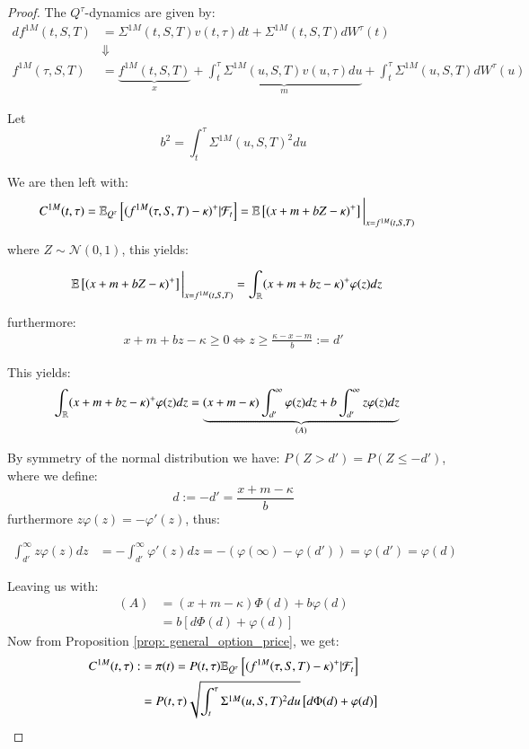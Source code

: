 \begin{proof}
The $Q^{\tau}$-dynamics are given by: 
\begin{align*}
df^{1M}(t,S,T) &= 
\Sigma^{1M}(t,S,T)v(t,\tau)dt + \Sigma^{1M}(t,S,T)dW^{\tau}(t)\\ 
&\Downarrow \\ 
f^{1M}(\tau,S,T) &= 
\underbrace{f^{1M}(t,S,T)}_{x} + 
\underbrace{\int_{t}^{\tau}\Sigma^{1M}(u,S,T)v(u,\tau)du}_{m} +  
\int_{t}^{\tau}\Sigma^{1M}(u,S,T)dW^{\tau}(u)
\end{align*}    

Let 
\[
b^{2} = \int_{t}^{\tau}\Sigma^{1M}(u,S,T)^{2}du
\]

We are then left with: 
\begin{align*}
C^{1M}(t,\tau) &= 
\mathbb{E}_{Q^{\tau}}\left[
(f^{1M}(\tau, S,T)-\kappa)^{+}|\mathcal{F}_{t}
\right]    
= 
\mathbb{E}\left[
(x+m+bZ-\kappa)^{+}
\right]\bigg{|}_{x = f^{1M}(t,S,T)}
\end{align*}

where $Z \sim \mathcal{N}(0,1)$, this yields: 

\begin{align*}
\mathbb{E}\left[
(x+m+bZ-\kappa)^{+}
\right]\bigg{|}_{x = f^{1M}(t,S,T)} 
&= 
\int_{\mathbb{R}}(x+m+bz-\kappa)^{+}\varphi(z)dz 
\end{align*}

furthermore: 
\begin{align*}
x + m + bz - \kappa \geq 0 \iff z \geq \frac{\kappa-x-m}{b}:= d'    
\end{align*}

This yields: 
\begin{align*}
\int_{\mathbb{R}}(x+m+bz-\kappa)^{+}\varphi(z)dz  
&= 
\underbrace{
(x+m-\kappa)\int_{d'}^{\infty}\varphi(z)dz
+ b\int_{d'}^{\infty}z\varphi(z)dz
}_{(A)}
\end{align*}

By symmetry of the normal distribution we have: $P(Z > d') = P(Z \leq -d')$, 
where we define: 
\[
d := -d' = \frac{x+m-\kappa}{b}
\]
furthermore $z\varphi(z) = - \varphi'(z)$, thus:

\begin{align*}
\int_{d'}^{\infty}z\varphi(z)dz
&= 
-\int_{d'}^{\infty}\varphi'(z)dz 
= 
-(\varphi(\infty) - \varphi(d'))
= \varphi(d') = \varphi(d)
\end{align*}

Leaving us with:
\begin{align*}
(A) &= (x+m-\kappa)\Phi(d) + b\varphi(d) \\ 
&= b[d\Phi(d) + \varphi(d)]
\end{align*}
Now from Proposition \ref{prop: general_option_price}, we get: 
\begin{align*}
C^{1M}(t,\tau) :&= \pi(t) = P(t,\tau)\mathbb{E}_{Q^{\tau}}\left[
(f^{1M}(\tau, S,T)-\kappa)^{+}|\mathcal{F}_{t}
\right] \\ 
&= 
P(t,\tau)\sqrt{
\int_{t}^{\tau}\Sigma^{1M}(u,S,T)^{2}du
}\left[
d\Phi(d) + \varphi(d)
\right]
\end{align*}
\end{proof}


